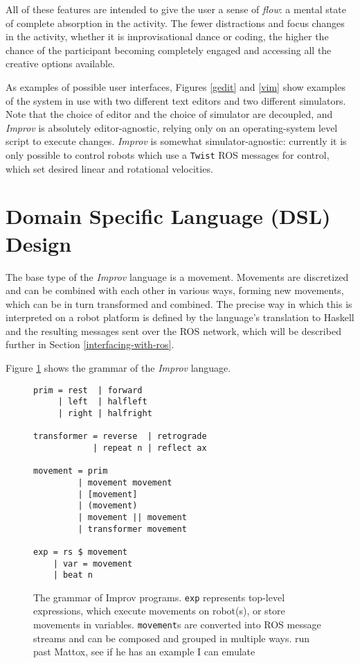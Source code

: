 \documentclass[sigconf]{acmart}
\begin{document}
All of these features are intended to give the user a sense of \emph{flow}: a
mental state of complete absorption in the activity. The fewer distractions and
focus changes in the activity, whether it is improvisational dance or coding,
the higher the chance of the participant becoming completely engaged and
accessing all the creative options available.


As examples of possible user interfaces, Figures \ref{gedit} and \ref{vim} show examples of the system in use with two
different text editors and two different simulators. Note that the choice of
editor and the choice of simulator are decoupled, and \emph{Improv} is
absolutely editor-agnostic, relying only on an operating-system level script
to execute changes. \emph{Improv} is somewhat simulator-agnostic: 
currently it is only possible to control robots which use a \texttt{Twist} ROS messages
for control, which set desired linear and rotational
velocities.



\section{Domain Specific Language (DSL)
Design}\label{domain-specific-language-design}


The base type of the \emph{Improv} language is a movement. Movements are
discretized and can be combined with each other in various ways, forming new
movements, which can be in turn transformed and combined. The precise way in
which this is interpreted on a robot platform is defined by the language's
translation to Haskell and the resulting messages sent over the ROS network,
which will be described further in Section \ref{interfacing-with-ros}.

Figure \ref{grammar} shows the grammar of the \emph{Improv} language.

\begin{figure}
\centering
\begin{verbatim}
prim = rest  | forward 
     | left  | halfleft
     | right | halfright

transformer = reverse  | retrograde 
            | repeat n | reflect ax

movement = prim
         | movement movement
         | [movement]
         | (movement)
         | movement || movement 
         | transformer movement

exp = rs $ movement
    | var = movement
    | beat n
\end{verbatim}
\caption{The grammar of Improv programs. \texttt{exp} represents top-level
expressions, which execute movements on robot(s), or store movements in
variables. \texttt{movement}s are converted into ROS message streams and can be
composed and grouped in multiple ways. {\color{red} run past Mattox, see if he
has an example I can emulate} \label{grammar}}

\end{figure}
\end{document}
